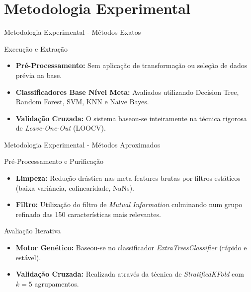 \documentclass [aspectratio=169]{beamer}
\begin{document}
\section{Metodologia Experimental}

\begin{frame}{Metodologia Experimental - Métodos Exatos}
\begin{block}{Execução e Extração}
\begin{itemize}
    \item \textbf{Pré-Processamento:} Sem aplicação de transformação ou seleção de dados prévia na base.
    \item \textbf{Classificadores Base Nível Meta:} Avaliados utilizando Decision Tree, Random Forest, SVM, KNN e Naive Bayes.
    \item \textbf{Validação Cruzada:} O sistema baseou-se inteiramente na técnica rigorosa de \textit{Leave-One-Out} (LOOCV).
\end{itemize}
\end{block}
\end{frame}

\begin{frame}{Metodologia Experimental - Métodos Aproximados}
\begin{block}{Pré-Processamento e Purificação}
\begin{itemize}
    \item \textbf{Limpeza:} Redução drástica nas meta-features brutas por filtros estáticos (baixa variância, colinearidade, NaNs).
    \item \textbf{Filtro:} Utilização do filtro de \textit{Mutual Information} culminando num grupo refinado das 150 características mais relevantes.
\end{itemize}
\end{block}

\vspace{0.3cm}
\begin{block}{Avaliação Iterativa}
\begin{itemize}
    \item \textbf{Motor Genético:} Baseou-se no classificador \textit{ExtraTreesClassifier} (rápido e estável).
    \item \textbf{Validação Cruzada:} Realizada através da técnica de \textit{StratifiedKFold} com $k=5$ agrupamentos.
\end{itemize}
\end{block}
\end{frame}
\end{document}
